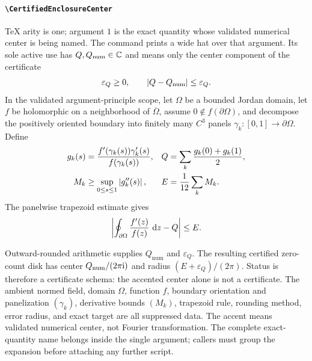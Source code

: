 \documentclass[11pt,oneside]{article}
\theoremstyle{definition}
\theoremstyle{remark}
\DeclareRobustCommand{\commandname}[1]{\texttt{\textbackslash#1}}
\DeclareRobustCommand{\localaccentname}[1]{\commandname{#1}}
\begin{document}
\paragraph{\localaccentname{CertifiedEnclosureCenter}}
TeX arity is one; argument \(1\) is the exact quantity whose validated numerical
center is being named.  The command prints a wide hat over that argument.
Its sole active use has \(Q,Q_{\mathrm{num}}\in\mathbb{C}\) and means only
the center component of the certificate
\[
 \varepsilon_Q\ge0,\qquad
 \left\lvert Q-Q_{\mathrm{num}}\right\rvert\le\varepsilon_Q.
\]
In the validated argument-principle scope, let \(\Omega\) be a bounded Jordan domain,
let \(f\) be holomorphic on a neighborhood of \(\overline\Omega\), assume
\(0\notin f(\partial\Omega)\), and decompose the positively oriented boundary into
finitely many \(C^3\) panels \(\gamma_k:[0,1]\to\partial\Omega\).  Define
\[
 \begin{aligned}
 g_k(s)&=
 \frac{f'(\gamma_k(s))\gamma_k'(s)}{f(\gamma_k(s))},
 &Q&=\sum_k\frac{g_k(0)+g_k(1)}2,\\
 M_k&\ge\sup_{0\le s\le1}\left\lvert g_k''(s)\right\rvert,
 &E&=\frac1{12}\sum_kM_k.
 \end{aligned}
\]
The panelwise trapezoid estimate gives
\[
 \left\lvert \oint_{\partial\Omega}\frac{f'(z)}{f(z)}\,\mathop{}\!\mathrm{d} z-Q\right\rvert
 \le E.
\]
\par{}\noindent
Outward-rounded arithmetic supplies \(Q_{\mathrm{num}}\) and
\(\varepsilon_Q\).  The resulting certified zero-count disk has center
\(Q_{\mathrm{num}}/(2\pi\mathrm{i})\) and radius
\((E+\varepsilon_Q)/(2\pi)\).  Status is therefore a certificate schema:
the accented center alone is not a certificate.  The ambient normed field,
domain \(\Omega\), function \(f\), boundary orientation and panelization
\((\gamma_k)\), derivative bounds \((M_k)\), trapezoid rule, rounding method,
error radius, and exact target are all suppressed data.
The accent means validated numerical center, not Fourier transformation.
The complete exact-quantity name belongs inside the single argument; callers
must group the expansion before attaching any further script.
\end{document}
